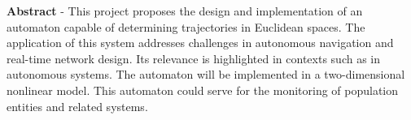     \textbf{Abstract} - This project proposes the design and implementation of an automaton
        capable of determining trajectories in Euclidean spaces. The application of this system
        addresses challenges in autonomous navigation and real-time network design.
        Its relevance is highlighted in contexts such as in autonomous systems. The automaton
        will be implemented in a two-dimensional nonlinear model. This automaton could
        serve for the monitoring of population entities and related systems.
    
    
    